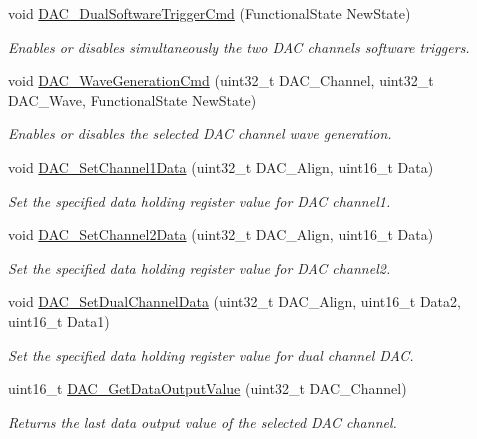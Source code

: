 \begin{DoxyCompactItemize}
void \hyperlink{group___d_a_c_gab4d3b364a6b184dcd65f3b294ebf56dc}{D\+A\+C\+\_\+\+Dual\+Software\+Trigger\+Cmd} (Functional\+State New\+State)
\begin{DoxyCompactList}\small\item\em Enables or disables simultaneously the two D\+AC channels software triggers. \end{DoxyCompactList}\item 
void \hyperlink{group___d_a_c_gabd51ae6880821d4dcd923969ec19a19e}{D\+A\+C\+\_\+\+Wave\+Generation\+Cmd} (uint32\+\_\+t D\+A\+C\+\_\+\+Channel, uint32\+\_\+t D\+A\+C\+\_\+\+Wave, Functional\+State New\+State)
\begin{DoxyCompactList}\small\item\em Enables or disables the selected D\+AC channel wave generation. \end{DoxyCompactList}\item 
void \hyperlink{group___d_a_c_gad06b4230d2b17d1d13f41dce4c782461}{D\+A\+C\+\_\+\+Set\+Channel1\+Data} (uint32\+\_\+t D\+A\+C\+\_\+\+Align, uint16\+\_\+t Data)
\begin{DoxyCompactList}\small\item\em Set the specified data holding register value for D\+AC channel1. \end{DoxyCompactList}\item 
void \hyperlink{group___d_a_c_ga44e12006ec186791378d132da8541552}{D\+A\+C\+\_\+\+Set\+Channel2\+Data} (uint32\+\_\+t D\+A\+C\+\_\+\+Align, uint16\+\_\+t Data)
\begin{DoxyCompactList}\small\item\em Set the specified data holding register value for D\+AC channel2. \end{DoxyCompactList}\item 
void \hyperlink{group___d_a_c_ga4ca2cfdf56ab35a23f2517f23d7fbb24}{D\+A\+C\+\_\+\+Set\+Dual\+Channel\+Data} (uint32\+\_\+t D\+A\+C\+\_\+\+Align, uint16\+\_\+t Data2, uint16\+\_\+t Data1)
\begin{DoxyCompactList}\small\item\em Set the specified data holding register value for dual channel D\+AC. \end{DoxyCompactList}\item 
uint16\+\_\+t \hyperlink{group___d_a_c_ga51274838de1e5dd012a82d7f44d7a50b}{D\+A\+C\+\_\+\+Get\+Data\+Output\+Value} (uint32\+\_\+t D\+A\+C\+\_\+\+Channel)
\begin{DoxyCompactList}\small\item\em Returns the last data output value of the selected D\+AC channel. \end{DoxyCompactList}\item 

\end{DoxyCompactItemize}
